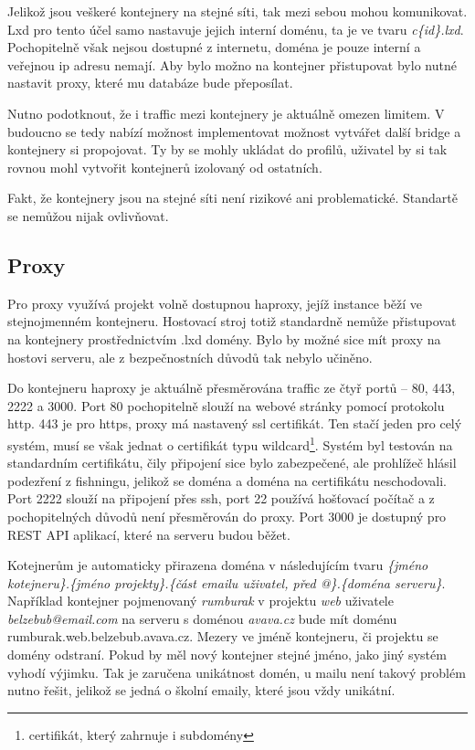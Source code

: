 \documentclass[a4paper,oneside,12pt]{report}
\begin{document}
Jelikož jsou veškeré kontejnery na stejné síti, tak mezi sebou mohou komunikovat.
Lxd pro tento účel samo nastavuje jejich interní doménu, ta je ve tvaru \textit{c\{id\}.lxd}.
Pochopitelně však nejsou dostupné z internetu, doména je pouze interní a veřejnou ip adresu nemají.
Aby bylo možno na kontejner přistupovat bylo nutné nastavit proxy, které mu databáze bude přeposílat.

Nutno podotknout, že i traffic mezi kontejnery je aktuálně omezen limitem.
V budoucno se tedy nabízí možnost implementovat možnost vytvářet další bridge a kontejnery si propojovat.
Ty by se mohly ukládat do profilů, uživatel by si tak rovnou mohl vytvořit kontejnerů izolovaný od ostatních.

Fakt, že kontejnery jsou na stejné síti není rizikové ani problematické.
Standartě se nemůžou nijak ovlivňovat.

\subsection{Proxy}

Pro proxy využívá projekt volně dostupnou haproxy, jejíž instance běží ve stejnojmenném kontejneru.
Hostovací stroj totiž standardně nemůže přistupovat na kontejnery prostřednictvím .lxd domény.
Bylo by možné sice mít proxy na hostovi serveru, ale z bezpečnostních důvodů tak nebylo učiněno.

Do kontejneru haproxy je aktuálně přesměrována traffic ze čtyř portů -- 80, 443, 2222 a 3000.
Port 80 pochopitelně slouží na webové stránky pomocí protokolu http.
443 je pro https, proxy má nastavený ssl certifikát.
Ten stačí jeden pro celý systém, musí se však jednat o certifikát typu wildcard\footnote{certifikát, který zahrnuje i subdomény}.
Systém byl testován na standardním certifikátu, čily připojení sice bylo zabezpečené, ale prohlížeč hlásil podezření z fishningu, jelikož se doména a doména na certifikátu neschodovali.
Port 2222 slouží na připojení přes ssh, port 22 používá hošťovací počítač a z pochopitelných důvodů není přesměrován do proxy.
Port 3000 je dostupný pro REST API aplikací, které na serveru budou běžet.

Kotejnerům je automaticky přirazena doména v následujícím tvaru \textit{\{jméno kotejneru\}.\{jméno projekty\}.\{část emailu uživatel, před @\}.\{doména serveru\}}.
Například kontejner pojmenovaný \textit{rumburak} v projektu \textit{web} uživatele \textit{belzebub@email.com} na serveru s doménou \textit{avava.cz} bude mít doménu {rumburak.web.belzebub.avava.cz}.
Mezery ve jméně kontejneru, či projektu se domény odstraní.
Pokud by měl nový kontejner stejné jméno, jako jiný systém vyhodí výjimku.
Tak je zaručena unikátnost domén, u mailu není takový problém nutno řešit, jelikož se jedná o školní emaily, které jsou vždy unikátní.
\end{document}
